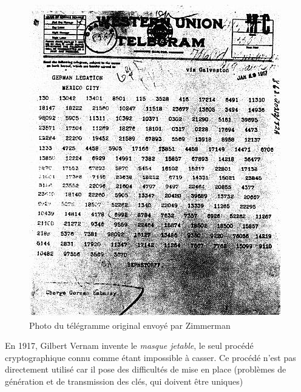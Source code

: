 \begin{figure}[h]
  \begin{center}
    \includegraphics[scale=0.4]{images/ZimmermanTelegram.jpg}
  \end{center}
  \caption{Photo du télégramme original envoyé par Zimmerman}
  \label{fig:JeffersonDisk}
\end{figure}

En 1917, Gilbert Vernam invente le \emph{masque jetable}, le
seul procédé cryptographique connu comme étant impossible à casser. Ce
procédé n'est pas directement utilisé car il pose des difficultés de
mise en place (problèmes de génération et de transmission des clés,
qui doivent être uniques) \\%

